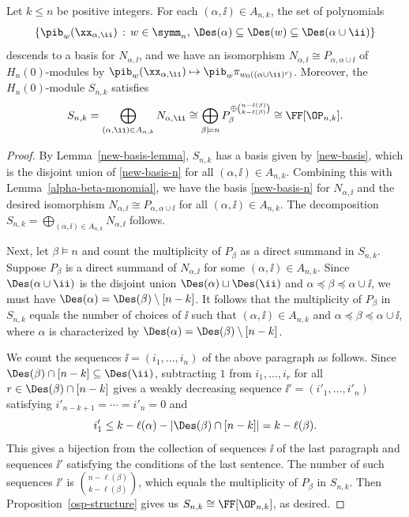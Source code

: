 \begin{theorem}
\label{s-decomposition-theorem}
Let $k \leq n$ be positive integers. 
For each $(\alpha,\ii) \in A_{n,k}$, the set of polynomials 
\begin{equation}
\label{new-basis-n}
\{ \pib_w(\xx_{\alpha,\ii}) \,:\, w \in \symm_n, \, \Des(\alpha) \subseteq \Des(w) 
\subseteq \Des(\alpha \cup \ii) \}
\end{equation}
descends to a basis for $N_{\alpha,\ii}$, and we have an isomorphism $N_{\alpha,\ii} \cong P_{\alpha,\alpha \cup \ii}$ of $H_n(0)$-modules by $\pib_w(\xx_{\alpha,\ii}) \mapsto \pib_w\pi_{w_0((\alpha\cup\ii)^c)}$.
Moreover, the $H_n(0)$-module $S_{n,k}$ satisfies
\begin{equation}
S_{n,k} = \bigoplus_{(\alpha,\ii) \in A_{n,k}} N_{\alpha,\ii} 
\cong \bigoplus_{\beta \models n} P_{\beta}^{\oplus{n - \ell(\beta) \choose k - \ell(\beta)}} \cong \FF[\OP_{n,k}].
\end{equation}
\end{theorem}

\begin{proof}
By Lemma~\ref{new-basis-lemma}, $S_{n,k}$ has a basis given by \eqref{new-basis}, which is the disjoint union of \eqref{new-basis-n} for all $(\alpha, \ii) \in A_{n,k}$.
Combining this with Lemma~\ref{alpha-beta-monomial}, we have the basis \eqref{new-basis-n} for $N_{\alpha,\ii}$ and the desired isomorphism $N_{\alpha,\ii} \cong P_{\alpha,\alpha\cup\ii}$ for all $(\alpha, \ii) \in A_{n,k}$.
The decomposition $S_{n,k} = \bigoplus_{(\alpha,\ii) \in A_{n,k}} N_{\alpha,\ii}$ follows.

Next, let $\beta\models n$ and count the multiplicity of $P_{\beta}$ as a direct summand in $S_{n,k}$.
Suppose $P_{\beta}$ is a direct summand of $N_{\alpha,\ii}$ for some $(\alpha,\ii) \in A_{n,k}$.
Since $\Des(\alpha \cup \ii)$ is the disjoint union $\Des(\alpha) \sqcup \Des(\ii)$ and
$\alpha \preceq \beta \preceq \alpha \cup \ii$, we must have $\Des(\alpha) = \Des(\beta) \setminus [n-k]$.
It follows that the multiplicity of $P_{\beta}$ in $S_{n,k}$ equals the number of 
choices of $\ii$ such that $(\alpha,\ii) \in A_{n,k}$ and
$\alpha \preceq \beta \preceq \alpha \cup \ii$, where $\alpha$ is characterized by
$\Des(\alpha) = \Des(\beta) \setminus [n-k]$.

We count the sequences $\ii = (i_1, \dots, i_n)$ of the above paragraph as follows.
Since $\Des(\beta) \cap [n-k] \subseteq \Des(\ii)$,  subtracting $1$ from $i_1, \dots, i_r$ for all
$r \in \Des(\beta) \cap [n-k]$ gives a weakly decreasing sequence $\ii' = (i'_1, \dots, i'_n)$ satisfying
$i'_{n-k+1} = \cdots = i'_n = 0$ and
\begin{equation*}
i'_1 \leq k - \ell(\alpha) - |\Des(\beta) \cap [n-k]| = k - \ell(\beta).
\end{equation*}
This gives a bijection from the collection of sequences $\ii$ of the last paragraph and 
sequences $\ii'$ satisfying the conditions of the last sentence.    
The number of such sequences $\ii'$ is ${n - \ell(\beta) \choose k - \ell(\beta)}$, which equals the multiplicity of $P_\beta$ in $S_{n,k}$.
Then Proposition~\ref{osp-structure} gives us $S_{n,k} \cong \FF[\OP_{n,k}]$, as desired.
\end{proof}
